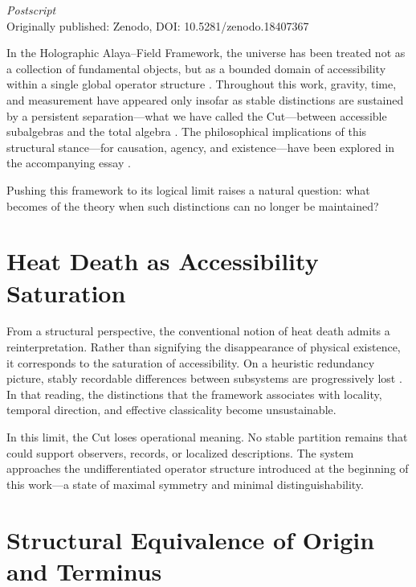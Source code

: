 \documentclass[12pt,a4paper,openany]{book}
\begin{document}
\begin{center}
\textit{Postscript}\\[0.5em]
Originally published: Zenodo, DOI: 10.5281/zenodo.18407367
\end{center}

\bigskip


In the Holographic Alaya--Field Framework, the universe has been treated not as a collection of fundamental objects, but as a bounded domain of accessibility within a single global operator structure \cite{Liu2026PaperA,Liu2026PaperB}. Throughout this work, gravity, time, and measurement have appeared only insofar as stable distinctions are sustained by a persistent separation---what we have called the Cut---between accessible subalgebras and the total algebra \cite{Liu2026PaperE,Liu2026PaperG}. The philosophical implications of this structural stance---for causation, agency, and existence---have been explored in the accompanying essay \cite{Liu2026PaperC}.

Pushing this framework to its logical limit raises a natural question: what becomes of the theory when such distinctions can no longer be maintained?

\section*{Heat Death as Accessibility Saturation}

From a structural perspective, the conventional notion of heat death admits a reinterpretation. Rather than signifying the disappearance of physical existence, it corresponds to the saturation of accessibility. On a heuristic redundancy picture, stably recordable differences between subsystems are progressively lost \cite{Zurek2009}. In that reading, the distinctions that the framework associates with locality, temporal direction, and effective classicality become unsustainable.

In this limit, the Cut loses operational meaning. No stable partition remains that could support observers, records, or localized descriptions. The system approaches the undifferentiated operator structure introduced at the beginning of this work---a state of maximal symmetry and minimal distinguishability.

\section*{Structural Equivalence of Origin and Terminus}
\end{document}
